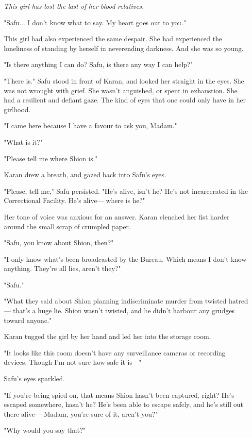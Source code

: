 \emph{This girl has lost the last of her blood relatives.}

"Safu... I don't know what to say. My heart goes out to you."

This girl had also experienced the same despair. She had experienced the
loneliness of standing by herself in neverending darkness. And she was
so young.

"Is there anything I can do? Safu, is there any way I can help?"

"There is." Safu stood in front of Karan, and looked her straight in the
eyes. She was not wrought with grief. She wasn't anguished, or spent in
exhaustion. She had a resilient and defiant gaze. The kind of eyes that
one could only have in her girlhood.

"I came here because I have a favour to ask you, Madam."

"What is it?"

"Please tell me where Shion is."

Karan drew a breath, and gazed back into Safu's eyes.

"Please, tell me," Safu persisted. "He's alive, isn't he? He's not
incarcerated in the Correctional Facility. He's alive--- where is he?"

Her tone of voice was anxious for an answer. Karan clenched her fist
harder around the small scrap of crumpled paper.

"Safu, you know about Shion, then?"

"I only know what's been broadcasted by the Bureau. Which means I don't
know anything. They're all lies, aren't they?"

"Safu."

"What they said about Shion planning indiscriminate murder from twisted
hatred--- that's a huge lie. Shion wasn't twisted, and he didn't harbour
any grudges toward anyone."

Karan tugged the girl by her hand and led her into the storage room.

"It looks like this room doesn't have any surveillance cameras or
recording devices. Though I'm not sure how safe it is---"

Safu's eyes sparkled.

"If you're being spied on, that means Shion hasn't been captured, right?
He's escaped somewhere, hasn't he? He's been able to escape safely, and
he's still out there alive--- Madam, you're sure of it, aren't you?"

"Why would you say that?"

